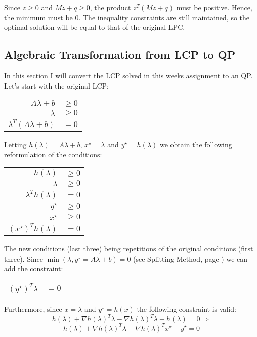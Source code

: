 \documentclass[10pt,oneside,a4paper,final,english]{memoir}
\begin{document}
Since $z\geq 0$ and $Mz+q\geq 0$, the product $z^T(Mz+q)$ must be
positive. Hence, the minimum must be $0$. The inequality constraints
are still maintained, so the optimal solution will be equal to that of
the original LPC.

\subsection{Algebraic Transformation from LCP to QP}
In this section I will convert the LCP solved in this weeks assignment
to an QP. Let's start with the original LCP:
\begin{center}\begin{tabular}{rl}
$A\lambda + b$ & $\geq 0$ \\
$\lambda$ & $\geq 0$\\
$\lambda^T (A\lambda + b)$ & $= 0$
\end{tabular}\end{center}

Letting $h(\lambda) = A\lambda + b$, $x^\star = \lambda$ and $y^\star
= h(\lambda)$ we obtain the following reformulation of the
conditions:
\begin{center}\begin{tabular}{rl}
$h(\lambda)$ & $\geq 0$ \\
$\lambda$ & $\geq 0$\\
$\lambda^T h(\lambda)$ & $= 0$\\

$y^\star $&$\geq 0$ \\
$x^\star $&$\geq 0$ \\
$(x^\star)^T h(\lambda)$&$= 0$
\end{tabular}\end{center}

The new conditions (last three) being repetitions of the original
conditions (first three). Since $\min(\lambda, y^\star = A\lambda+b) =
0$ (see Splitting Method, page \pageref{splitting}) we can add the
constraint:
\begin{center}\begin{tabular}{rl}
    $(y^\star)^T \lambda $&$= 0$
\end{tabular}\end{center}

Furthermore, since $x = \lambda$ and $y^\star = h(x)$ the following
constraint is valid:
\[ h(\lambda) + \nabla h(\lambda)^T \lambda - \nabla h(\lambda)^T
\lambda - h(\lambda) = 0 \Rightarrow\]
\[ h(\lambda) + \nabla h(\lambda)^T \lambda - \nabla h(\lambda)^T
x^\star - y^\star = 0 \]
\end{document}
